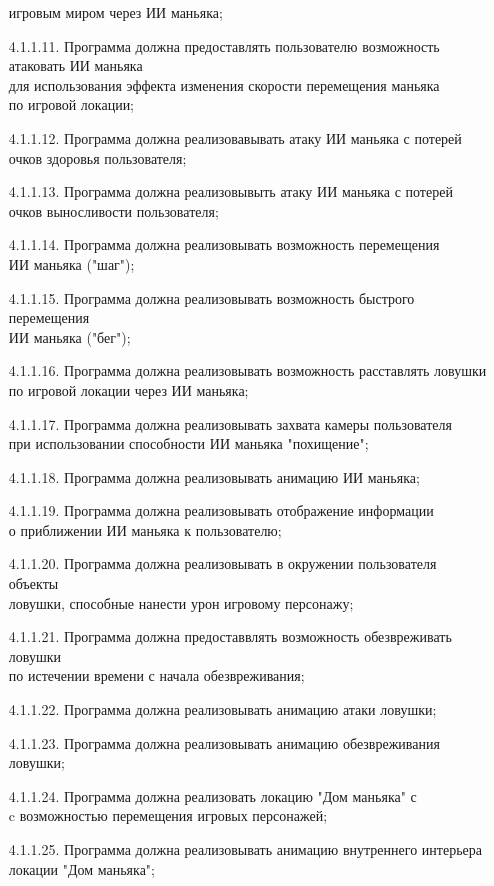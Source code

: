 \begin{enumerate}
    игровым миром через ИИ маньяка;
    \item[4.1.1.11.] Программа должна предоставлять пользователю возможность атаковать ИИ маньяка\\
    для использования эффекта изменения скорости перемещения маньяка \\по игровой локации;
    \item[4.1.1.12.] Программа должна реализовавывать атаку ИИ маньяка с потерей\\
    очков здоровья пользователя;
    \item[4.1.1.13.] Программа должна реализовывыть атаку ИИ маньяка с потерей\\ 
    очков выносливости пользователя;
    \item[4.1.1.14.] Программа должна реализовывать возможность перемещения\\
    ИИ маньяка ("шаг");
    \item[4.1.1.15.] Программа должна реализовывать возможность быстрого перемещения\\
    ИИ маньяка ("бег");
    \item[4.1.1.16.] Программа должна реализовывать возможность расставлять ловушки\\
    по игровой локации через ИИ маньяка;
    \item[4.1.1.17.] Программа должна реализовывать захвата камеры пользователя\\
    при использовании способности ИИ маньяка "похищение";
    \item[4.1.1.18.] Программа должна реализовывать анимацию ИИ маньяка;
    \item[4.1.1.19.] Программа должна реализовывать отображение информации\\
    о приближении ИИ маньяка к пользователю;
    \item[4.1.1.20.] Программа должна реализовывать в окружении пользователя объекты\\
    ловушки, способные нанести урон игровому персонажу;
    \item[4.1.1.21.] Программа должна предоставвлять возможность обезвреживать ловушки\\
    по истечении времени с начала обезвреживания;
    \item[4.1.1.22.] Программа должна реализовывать анимацию атаки ловушки;
    \item[4.1.1.23.] Программа должна реализовывать анимацию обезвреживания ловушки;
    \item[4.1.1.24.] Программа должна реализовать локацию "Дом маньяка" с\\
    c возможностью перемещения игровых персонажей;
    \item[4.1.1.25.] Программа должна реализовывать анимацию внутреннего интерьера\\
    локации "Дом маньяка";
\end{enumerate}

